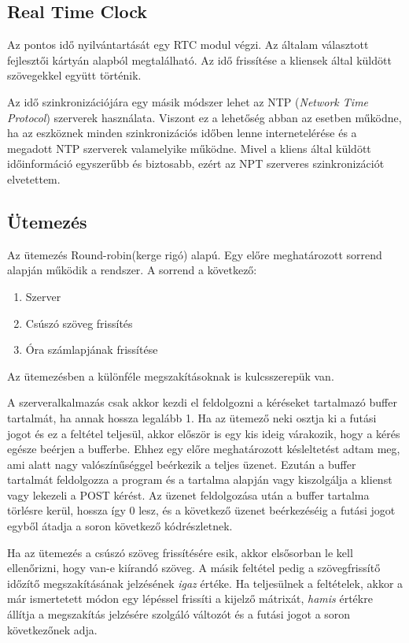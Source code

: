 \documentclass[a4paper, 12pt]{article}
\begin{document}
\subsection{Real Time Clock}
Az pontos idő nyilvántartását egy RTC modul végzi. Az általam választott fejlesztői kártyán alapból megtalálható.
Az idő frissítése a kliensek által küldött szövegekkel együtt történik.

Az idő szinkronizációjára egy másik módszer lehet az NTP (\textit{Network Time Protocol}) szerverek használata. Viszont ez a lehetőség abban az esetben működne, ha az eszköznek minden szinkronizációs időben lenne internetelérése és a megadott NTP szerverek valamelyike működne.
Mivel a kliens által küldött időinformáció egyszerűbb és biztosabb, ezért az NPT szerveres szinkronizációt elvetettem.

\subsection{Ütemezés}
Az ütemezés Round-robin(kerge rigó) alapú. Egy előre meghatározott sorrend alapján működik a rendszer. A sorrend a következő:
\begin{enumerate}
	\item Szerver
	\item Csúszó szöveg frissítés
	\item Óra számlapjának frissítése
\end{enumerate}
Az ütemezésben a különféle megszakításoknak is kulcsszerepük van.

A szerveralkalmazás csak akkor kezdi el feldolgozni a kéréseket tartalmazó buffer tartalmát, ha annak hossza legalább 1. Ha az ütemező neki osztja ki a futási jogot és ez a feltétel teljesül, akkor először is egy kis ideig várakozik, hogy a kérés egésze beérjen a bufferbe. Ehhez egy előre meghatározott késleltetést adtam meg, ami alatt nagy valószínűséggel beérkezik a teljes üzenet. Ezután a buffer tartalmát feldolgozza a program és a tartalma alapján vagy kiszolgálja a klienst vagy lekezeli a POST kérést. Az üzenet feldolgozása után a buffer tartalma törlésre kerül, hossza így 0 lesz, és a következő üzenet beérkezéséig a futási jogot egyből átadja a soron következő kódrészletnek.

Ha az ütemezés a csúszó szöveg frissítésére esik, akkor elsősorban le kell ellenőrizni, hogy van-e kiírandó szöveg. A másik feltétel pedig a szövegfrissítő időzítő megszakításának jelzésének \textit{igaz} értéke. Ha teljesülnek a feltételek, akkor a már ismertetett módon egy lépéssel frissíti a kijelző mátrixát, \textit{hamis} értékre állítja a megszakítás jelzésére szolgáló változót és a futási jogot a soron következőnek adja.
\end{document}
